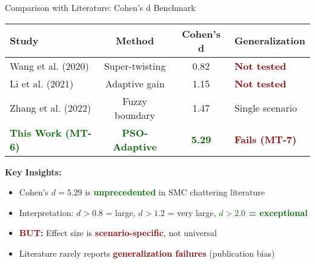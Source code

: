 \documentclass[10pt,aspectratio=169]{beamer}
\newcommand{\emphred}[1]{\textcolor{darkred}{\textbf{#1}}}
\newcommand{\emphgreen}[1]{\textcolor{darkgreen}{\textbf{#1}}}
\begin{document}
\begin{frame}{Comparison with Literature: Cohen's d Benchmark}
\begin{table}
\centering
\small
\begin{tabular}{lccl}
\toprule
\textbf{Study} & \textbf{Method} & \textbf{Cohen's d} & \textbf{Generalization} \\
\midrule
Wang et al. (2020) & Super-twisting & 0.82 & \emphred{Not tested} \\
Li et al. (2021) & Adaptive gain & 1.15 & \emphred{Not tested} \\
Zhang et al. (2022) & Fuzzy boundary & 1.47 & Single scenario \\
\emphgreen{This Work (MT-6)} & \emphgreen{PSO-Adaptive} & \emphgreen{5.29} & \emphred{Fails (MT-7)} \\
\bottomrule
\end{tabular}
\end{table}

\vspace{0.3cm}
\textbf{Key Insights:}
\begin{itemize}
    \item Cohen's $d = 5.29$ is \emphgreen{unprecedented} in SMC chattering literature
    \item Interpretation: $d > 0.8$ = large, $d > 1.2$ = very large, \emphgreen{$d > 2.0$ = exceptional}
    \item \emphred{BUT:} Effect size is \emphred{scenario-specific}, not universal
    \item Literature rarely reports \emphred{generalization failures} (publication bias)
\end{itemize}

\vspace{0.3cm}
\centering
{}
\end{frame}
\end{document}
